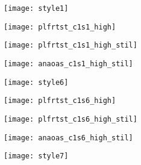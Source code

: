 \newpage
\begin{figure}[h]
	\centering
    \begin{subfigure}[b]{0.24\textwidth}
		\centering
        \texttt{[image: style1]}
        \label{fig:anaos_style1}
	\end{subfigure}
    \hfill
    \begin{subfigure}[b]{0.24\textwidth}
		\centering
        \texttt{[image: plfrtst\_c1s1\_high]}
        \label{fig:plfrtst_c1s1_high}
	\end{subfigure}
    \hfill
    \begin{subfigure}[b]{0.24\textwidth}
		\centering
        \texttt{[image: plfrtst\_c1s1\_high\_stil]}
        \label{fig:plfrtst_c1s1_high_stil}
	\end{subfigure}
    \hfill
    \begin{subfigure}[b]{0.24\textwidth}
		\centering
        \texttt{[image: anaoas\_c1s1\_high\_stil]}
        \label{fig:anaoas_c1s1_high_stil}
	\end{subfigure}
    \begin{subfigure}[b]{0.24\textwidth}
		\centering
        \texttt{[image: style6]}
        \label{fig:anaos_style6}
	\end{subfigure}
    \hfill
    \begin{subfigure}[b]{0.24\textwidth}
		\centering
        \texttt{[image: plfrtst\_c1s6\_high]}
        \label{fig:plfrtst_c1s6_high}
	\end{subfigure}
    \hfill
    \begin{subfigure}[b]{0.24\textwidth}
		\centering
        \texttt{[image: plfrtst\_c1s6\_high\_stil]}
        \label{fig:plfrtst_c1s6_high_stil}
	\end{subfigure}
    \hfill
    \begin{subfigure}[b]{0.24\textwidth}
		\centering
        \texttt{[image: anaoas\_c1s6\_high\_stil]}
        \label{fig:anaoas_c1s6_high_stil}
	\end{subfigure}
    \begin{subfigure}[b]{0.24\textwidth}
		\centering
        \texttt{[image: style7]}
        \label{fig:anaos_style7}
        \caption{}
	\end{subfigure}
    \hfill
    \begin{subfigure}[b]{0.24\textwidth}

\end{subfigure}
\end{figure}
